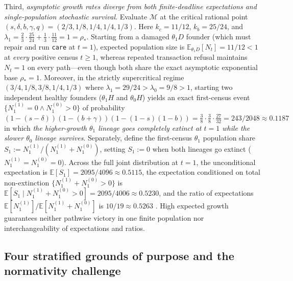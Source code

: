 \documentclass[11pt,a4paper]{article}
\begin{document}
Third, \emph{asymptotic growth rates diverge from both finite-deadline
expectations and single-population stochastic survival}. Evaluate
\(\mathcal{M}\) at the critical rational point
\((s,\delta,b,\gamma,q) = (2/3, 1/8, 1/4, 1/4, 1/3)\). Here
\(k_c = 11/12\), \(k_b = 25/24\), and
\(\lambda_1 = \frac{2}{3}\cdot\frac{25}{24} + \frac{1}{3}\cdot\frac{11}{12} = 1 = \rho_*\).
Starting from a damaged \(\theta_1 D\) founder (which must repair and
run \texttt{care} at \(t=1\)), expected population size is
\(\mathbb{E}_{\theta_1 D}[N_t] = 11/12 < 1\) at \emph{every} positive
census \(t \ge 1\), whereas repeated transaction refusal maintains
\(N_t = 1\) on every path---even though both share the exact asymptotic
exponential base \(\rho_* = 1\). Moreover, in the strictly supercritical
regime \((3/4, 1/8, 3/8, 1/4, 1/3)\) where
\(\lambda_1 = 29/24 > \lambda_0 = 9/8 > 1\), starting two independent
healthy founders (\(\theta_1 H\) and \(\theta_0 H\)) yields an exact
first-census event \(\{N_1^{(1)} = 0 \land N_1^{(0)} > 0\}\) of
probability
\((1 - (s-\delta))(1 - (b+\gamma))(1 - (1-s)(1-b)) = \frac{3}{8}\cdot\frac{3}{8}\cdot\frac{27}{32} = 243/2048 \approx 0.1187\)
in which \emph{the higher-growth \(\theta_1\) lineage goes completely
extinct at \(t=1\) while the slower \(\theta_0\) lineage survives}.
Separately, define the first-census \(\theta_1\) population share
\(S_1 := N_1^{(1)} / (N_1^{(1)} + N_1^{(0)})\), setting \(S_1 := 0\)
when both lineages go extinct (\(N_1^{(1)} = N_1^{(0)} = 0\)). Across
the full joint distribution at \(t=1\), the unconditional expectation is
\(\mathbb{E}[S_1] = 2095/4096 \approx 0.5115\), the expectation
conditioned on total non-extinction \(\{N_1^{(1)} + N_1^{(0)} > 0\}\) is
\(\mathbb{E}[S_1 \mid N_1^{(1)} + N_1^{(0)} > 0] = 2095/4006 \approx 0.5230\),
and the ratio of expectations
\(\mathbb{E}[N_1^{(1)}]/\mathbb{E}[N_1^{(1)} + N_1^{(0)}]\) is
\(10/19 \approx 0.5263\) \citep{price1970, athreyaNey1972}. High
expected growth guarantees neither pathwise victory in one finite
population nor interchangeability of expectations and ratios.

\subsection{Four stratified grounds of purpose and the normativity
challenge}\label{four-stratified-grounds-of-purpose-and-the-normativity-challenge}
\end{document}
